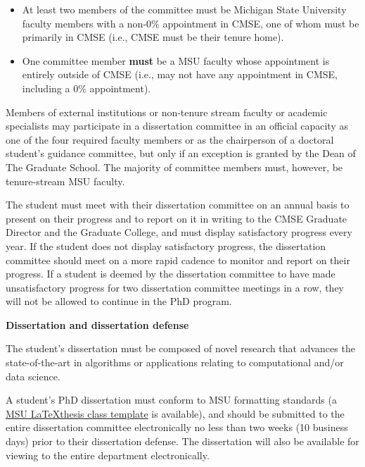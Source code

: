 \begin{itemize}
\item At least two members of the committee must be Michigan State
  University faculty members with a non-0\% appointment in CMSE, one
  of whom must be primarily in CMSE (i.e., CMSE must be their tenure
  home).

\item One committee member \textbf{must} be a MSU faculty whose appointment
  is entirely outside of CMSE (i.e., may not have any appointment in
  CMSE, including a 0\% appointment).

\end{itemize}

Members of external institutions or non-tenure stream faculty or
academic specialists may participate in a dissertation committee in an
official capacity as one of the four required faculty members or as
the chairperson of a doctoral student's guidance committee, but only
if an exception is granted by the Dean of The Graduate School.   The
majority of committee members must, however, be tenure-stream MSU
faculty.

The student must meet with their dissertation committee on an annual basis
to present on their progress and to report on it in writing to the CMSE Graduate
Director and the Graduate College, and must display satisfactory
progress every year.  If the student does not display satisfactory
progress, the dissertation committee should meet on a more rapid cadence to
monitor and report on their progress.  If a student is deemed by the
dissertation committee to have made unsatisfactory progress for two dissertation
committee meetings in a row, they will not be allowed to continue in
the PhD program.

\vspace{3mm}
\noindent
\textbf{Dissertation and dissertation defense}

The student's dissertation must be composed of novel research that
advances the state-of-the-art in algorithms or applications relating
to computational and/or data science.

A student's PhD dissertation must conform to MSU formatting standards
(a \href{http://ctan.org/pkg/msu-thesis}{MSU \LaTeX thesis class
  template} is available), and should be submitted to the entire
dissertation committee electronically no less than two weeks (10 business days) prior to
their dissertation defense.  The dissertation will also be available for
viewing to the entire department electronically.

